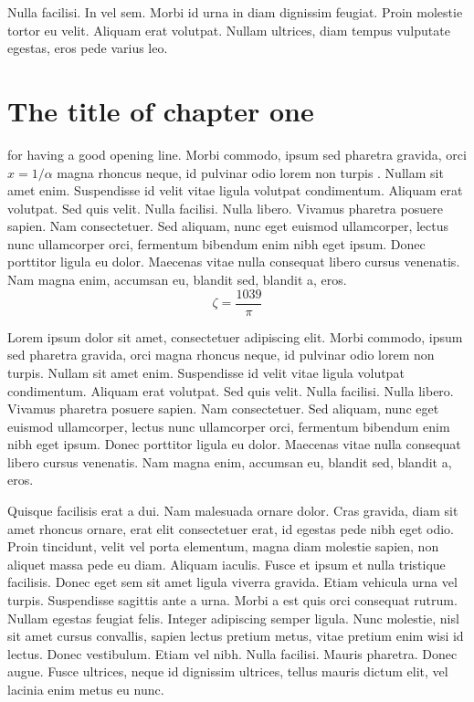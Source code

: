 \begin{savequote}[75mm]
Nulla facilisi. In vel sem. Morbi id urna in diam dignissim feugiat. Proin molestie tortor eu velit. Aliquam erat volutpat. Nullam ultrices, diam tempus vulputate egestas, eros pede varius leo.
\end{savequote}

\chapter{The title of chapter one}

 for having a good opening line. Morbi commodo, ipsum sed pharetra gravida, orci  $x = 1/\alpha$ magna rhoncus neque, id pulvinar odio lorem non turpis \cite{Eigen1971, Knuth1968}. Nullam sit amet enim. Suspendisse id velit vitae ligula volutpat condimentum. Aliquam erat volutpat. Sed quis velit. Nulla facilisi. Nulla libero. Vivamus pharetra posuere sapien. Nam consectetuer. Sed aliquam, nunc eget euismod ullamcorper, lectus nunc ullamcorper orci, fermentum bibendum enim nibh eget ipsum. Donec porttitor ligula eu dolor. Maecenas vitae nulla consequat libero cursus venenatis. Nam magna enim, accumsan eu, blandit sed, blandit a, eros.
$$\zeta = \frac{1039}{\pi}$$



Lorem ipsum dolor sit amet, consectetuer adipiscing elit. Morbi commodo, ipsum sed pharetra gravida, orci magna rhoncus neque, id pulvinar odio lorem non turpis. Nullam sit amet enim. Suspendisse id velit vitae ligula volutpat condimentum. Aliquam erat volutpat. Sed quis velit. Nulla facilisi. Nulla libero. Vivamus pharetra posuere sapien. Nam consectetuer. Sed aliquam, nunc eget euismod ullamcorper, lectus nunc ullamcorper orci, fermentum bibendum enim nibh eget ipsum. Donec porttitor ligula eu dolor. Maecenas vitae nulla consequat libero cursus venenatis. Nam magna enim, accumsan eu, blandit sed, blandit a, eros.

Quisque facilisis erat a dui. Nam malesuada ornare dolor. Cras gravida, diam sit amet rhoncus ornare, erat elit consectetuer erat, id egestas pede nibh eget odio. Proin tincidunt, velit vel porta elementum, magna diam molestie sapien, non aliquet massa pede eu diam. Aliquam iaculis. Fusce et ipsum et nulla tristique facilisis. Donec eget sem sit amet ligula viverra gravida. Etiam vehicula urna vel turpis. Suspendisse sagittis ante a urna. Morbi a est quis orci consequat rutrum. Nullam egestas feugiat felis. Integer adipiscing semper ligula. Nunc molestie, nisl sit amet cursus convallis, sapien lectus pretium metus, vitae pretium enim wisi id lectus. Donec vestibulum. Etiam vel nibh. Nulla facilisi. Mauris pharetra. Donec augue. Fusce ultrices, neque id dignissim ultrices, tellus mauris dictum elit, vel lacinia enim metus eu nunc.

